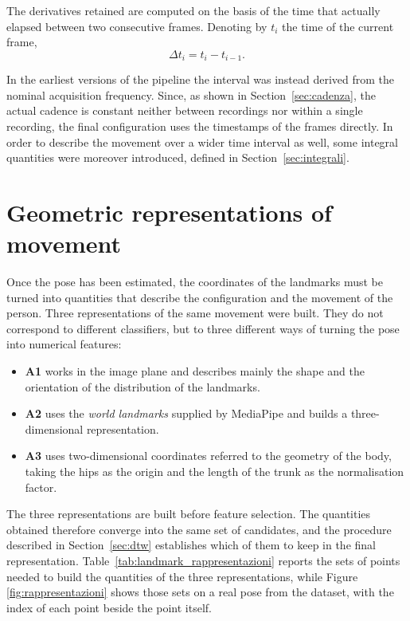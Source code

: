 The derivatives retained are computed on the basis of the time that actually elapsed between two consecutive frames. Denoting by $t_i$ the time of the current frame,
\[
\Delta t_i = t_i-t_{i-1}.
\]

In the earliest versions of the pipeline the interval was instead derived from the nominal acquisition frequency. Since, as shown in Section~\ref{sec:cadenza}, the actual cadence is constant neither between recordings nor within a single recording, the final configuration uses the timestamps of the frames directly. In order to describe the movement over a wider time interval as well, some integral quantities were moreover introduced, defined in Section~\ref{sec:integrali}.

\section{Geometric representations of movement}
\label{sec:rappresentazioni}

Once the pose has been estimated, the coordinates of the landmarks must be turned into quantities that describe the configuration and the movement of the person. Three representations of the same movement were built. They do not correspond to different classifiers, but to three different ways of turning the pose into numerical features:
\begin{itemize}
    \item \textbf{A1} works in the image plane and describes mainly the shape and the orientation of the distribution of the landmarks.
    \item \textbf{A2} uses the \emph{world landmarks} supplied by MediaPipe and builds a three-dimensional representation.
    \item \textbf{A3} uses two-dimensional coordinates referred to the geometry of the body, taking the hips as the origin and the length of the trunk as the normalisation factor.
\end{itemize}

The three representations are built before feature selection. The quantities obtained therefore converge into the same set of candidates, and the procedure described in Section~\ref{sec:dtw} establishes which of them to keep in the final representation.
Table~\ref{tab:landmark_rappresentazioni} reports the sets of points needed to build the quantities of the three representations, while Figure \ref{fig:rappresentazioni} shows those sets on a real pose from the dataset, with the index of each point beside the point itself.

